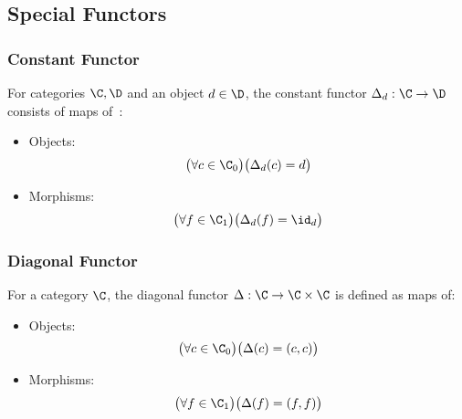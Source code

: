 \subsection{Special Functors}

\subsubsection{Constant Functor}
\begin{definition}
  For categories $\C,\D$ and an object $d\in \D$, the constant functor
  $\Delta_d: \C\to \D$ consists of maps
  of~\parencite[p.~142]{leinster:basic_category_theory}:
  \begin{itemize}
    \item Objects:
      \[\big(\forall c\in \C_0\big)
        \big(\Delta_d(c) = d\big)\]
    \item Morphisms:
      \[\big(\forall f\in \C_1\big)
        \big(\Delta_d(f) = \id_d\big)\]
  \end{itemize}
\end{definition}

\subsubsection{Diagonal Functor}
\begin{definition}
  For a category $\C$, the diagonal functor $\Delta: \C \to \C\times \C$ is
  defined as maps of:
  \begin{itemize}
    \item Objects:
      \[\big(\forall c\in \C_0\big)
        \big(\Delta(c) = (c,c)\big)\]
    \item Morphisms:
      \[\big(\forall f\in \C_1\big)
        \big(\Delta(f) = (f,f)\big)\]
  \end{itemize}
\end{definition}

